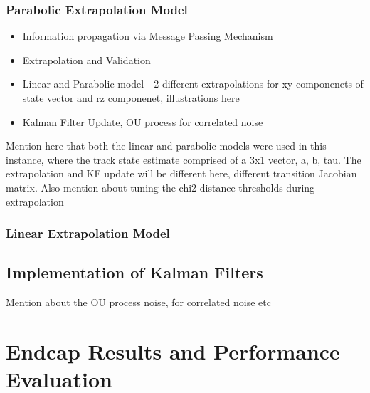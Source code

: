 \subsubsection{Parabolic Extrapolation Model}
\begin{itemize}
    \item Information propagation via Message Passing Mechanism
    \item Extrapolation and Validation
    \item Linear and Parabolic model - 2 different extrapolations for xy componenets of state vector and rz componenet, illustrations here
    \item Kalman Filter Update, OU process for correlated noise
\end{itemize}

Mention here that both the linear and parabolic models were used in this instance, where the track state estimate comprised of a 3x1 vector, a, b, tau. The extrapolation and KF update will be different here, different transition Jacobian matrix. Also mention about tuning the chi2 distance thresholds during extrapolation


\subsubsection{Linear Extrapolation Model}


\subsection{Implementation of Kalman Filters}
\label{gnn-kf-implementation}
Mention about the OU process noise, for correlated noise etc




\section{Endcap Results and Performance Evaluation}

